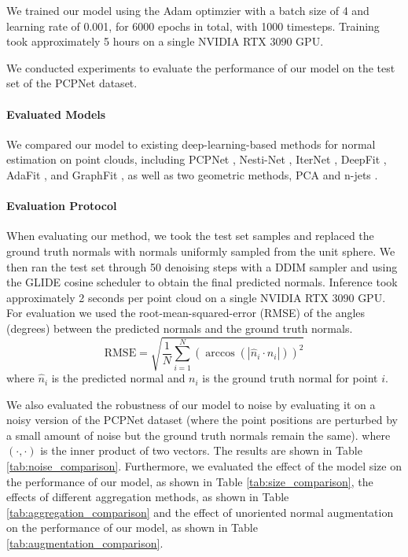\documentclass{acmart}
\begin{document}
We trained our model using the Adam optimzier with a batch size of 4 and learning rate of 0.001, for 6000 epochs in total, with 1000 timesteps. Training took approximately 5 hours on a single NVIDIA RTX 3090 GPU.

We conducted experiments to evaluate the performance of our model on the test set of the PCPNet dataset.

\paragraph{Evaluated Models}
We compared our model to existing deep-learning-based methods for normal estimation on point clouds, including PCPNet \cite{guerrero2018pcpnet}, Nesti-Net \cite{Ben-Shabat_2019_CVPR}, IterNet \cite{lenssen2020deep}, DeepFit \cite{ben2020deepfit}, AdaFit \cite{zhu2021adafit}, and GraphFit \cite{li2022graphfit}, as well as two geometric methods, PCA and n-jets \cite{CAZALS2005121}.
\paragraph{Evaluation Protocol}
When evaluating our method, we took the test set samples and replaced the ground truth normals with normals uniformly sampled from the unit sphere. We then ran the test set through 50 denoising steps with a DDIM sampler and using the GLIDE cosine scheduler \cite{DBLP:journals/corr/abs-2112-10741} to obtain the final predicted normals. Inference took approximately 2 seconds per point cloud on a single NVIDIA RTX 3090 GPU.
For evaluation we used the root-mean-squared-error (RMSE) of the angles (degrees) between the predicted normals and the ground truth normals.
\begin{equation}
    \text{RMSE} = \sqrt{\frac{1}{N}\sum_{i=1}^{N}(\arccos(|\hat{n}_i \cdot n_i|))^2}
\end{equation}
where $\hat{n}_i$ is the predicted normal and $n_i$ is the ground truth normal for point $i$.

We also evaluated the robustness of our model to noise by evaluating it on a noisy version of the PCPNet dataset (where the point positions are perturbed by a small amount of noise but the ground truth normals remain the same). where $(\cdot, \cdot)$ is the inner product of two vectors. The results are shown in Table \ref{tab:noise_comparison}. Furthermore, we evaluated the effect of the model size on the performance of our model, as shown in Table \ref{tab:size_comparison}, the effects of different aggregation methods, as shown in Table \ref{tab:aggregation_comparison} and the effect of unoriented normal augmentation on the performance of our model, as shown in Table \ref{tab:augmentation_comparison}.
\end{document}
